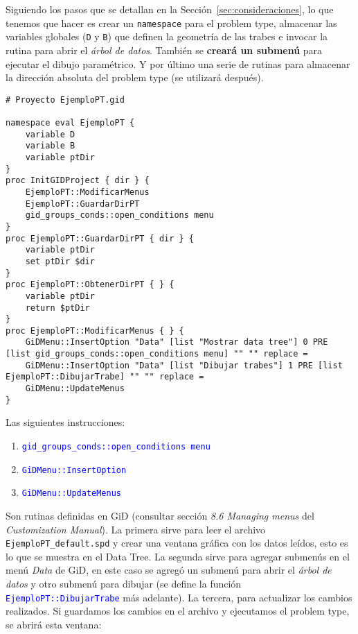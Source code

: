\documentclass[10pt, a4paper, twocolumn]{article} %
\begin{document}
Siguiendo los pasos que se detallan en la Sección~\ref{sec:consideraciones}, lo que tenemos que hacer es crear un \texttt{namespace} para el problem type, almacenar las variables globales (\texttt{D} y \texttt{B}) que definen la geometría de las trabes e invocar la rutina para abrir el \textit{árbol de datos}. También se \textbf{creará un submenú} para ejecutar el dibujo paramétrico. Y por último una serie de rutinas para almacenar la dirección absoluta del problem type (se utilizará después).

\lstset{language=tcl} 
\begin{lstlisting}[caption={Código para inicializar el proyecto y crear el menú.}]
# Proyecto EjemploPT.gid

namespace eval EjemploPT {
	variable D
	variable B
	variable ptDir
}
proc InitGIDProject { dir } {
	EjemploPT::ModificarMenus
	EjemploPT::GuardarDirPT
	gid_groups_conds::open_conditions menu
}
proc EjemploPT::GuardarDirPT { dir } {
	variable ptDir
	set ptDir $dir
}
proc EjemploPT::ObtenerDirPT { } {
	variable ptDir
	return $ptDir
}
proc EjemploPT::ModificarMenus { } {
	GiDMenu::InsertOption "Data" [list "Mostrar data tree"] 0 PRE [list gid_groups_conds::open_conditions menu] "" "" replace =
	GiDMenu::InsertOption "Data" [list "Dibujar trabes"] 1 PRE [list EjemploPT::DibujarTrabe] "" "" replace =
    GiDMenu::UpdateMenus
}
\end{lstlisting}

Las siguientes instrucciones:
\begin{enumerate}
	\item \textcolor{blue}{\texttt{gid\_groups\_conds::open\_conditions menu}}
	\item \textcolor{blue}{\texttt{GiDMenu::InsertOption}}
	\item \textcolor{blue}{\texttt{GiDMenu::UpdateMenus}}
\end{enumerate}

Son rutinas definidas en GiD (consultar sección \textit{8.6 Managing menus} del \textit{Customization Manual}). La primera sirve para leer el archivo \texttt{EjemploPT\_default.spd} y crear una ventana gráfica con los datos leídos, esto es lo que se muestra en el Data Tree. La segunda sirve para agregar submenús en el menú \textit{Data} de GiD, en este caso se agregó un submenú para abrir el \textit{árbol de datos} y otro submenú para dibujar (se define la función \textcolor{blue}{\texttt{EjemploPT::DibujarTrabe}} más adelante). La tercera, para actualizar los cambios realizados. Si guardamos los cambios en el archivo y ejecutamos el problem type, se abrirá esta ventana:
\end{document}

